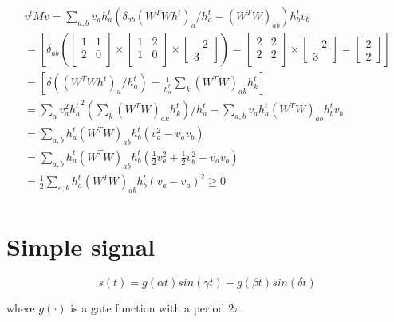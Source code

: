\documentclass{extreport}
\begin{document}
\begin{multline*}
  v^t M v =
  \sum_{a,b}v_a h_a^t (\delta_{ab}(W^TWh^t)_a / h_a^t
  -(W^TW)_{ab})h_b^t v_b \\
  =
  \left[
    \delta_{ab}
    \left(
      \begin{bmatrix}1 & 1 \\ 2 & 0 \\ \end{bmatrix} \times
      \begin{bmatrix}1 & 2 \\ 1 & 0 \\ \end{bmatrix} \times
      \begin{bmatrix} -2 \\ 3 \end{bmatrix}
    \right) =
      \begin{bmatrix}2 & 2 \\ 2 & 2 \\ \end{bmatrix} \times
      \begin{bmatrix} -2 \\ 3 \end{bmatrix} =
      \begin{bmatrix} 2 \\ 2 \end{bmatrix}
  \right] \\
  =
  \left[
    \delta((W^TWh^t)_a / h_a^t) =
    \frac{1}{h_a^t} \sum_k (W^TW)_{ak} h_k^t
  \right] \\
  =
  \sum_a v_a^2 {h_a^t}^2 (\sum_k(W^TW)_{ak}h_k^t)/h_a^t -
    \sum_{a,b} v_ah_a^t(W^TW)_{ab}h_b^tv_b \\
  = \sum_{a,b}h_a^t(W^TW)_{ab}h_b^t(v_a^2 - v_av_b) \\
  = \sum_{a,b}h_a^t(W^TW)_{ab}h_b^t(
    \frac{1}{2}v_a^2 + \frac{1}{2}v_b^2 - v_av_b) \\
  = \frac{1}{2} \sum_{a,b}h_a^t(W^TW)_{ab}h_b^t(v_a - v_a)^2 \geqslant 0 \\
\end{multline*}

\section{Simple signal}

\[
  s(t) = g(\alpha t) sin(\gamma t) + g(\beta t) sin(\delta t)
\]

where $g(\cdot)$ is a gate function with a period $2\pi$.
\end{document}
